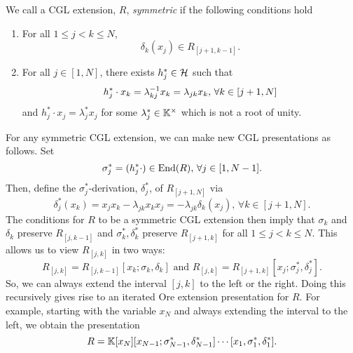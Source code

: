 \begin{definition}
	We call a CGL extension, $R$, \emph{symmetric} if the following conditions hold
	\begin{enumerate}
		\item For all $1\leq j < k \leq N$,
		      \begin{equation*}
			      \delta_k (x_j) \in R_{[j+1, k-1]}.
		      \end{equation*}
		\item For all $j \in [1, N]$, there exists $h^*_j \in \mathcal{H}$ such that
		      \begin{equation*}
			      h^*_j \cdot x_k = \lambda_{kj}^{-1} x_k = \lambda_{jk}x_k, \, \forall k \in [j+1, N]
		      \end{equation*}
		      and $h^*_j \cdot x_j = \lambda^*_j x_j$ for some $\lambda_j^*\in \mathbb{K}^\times$ which is not a root of unity.
	\end{enumerate}
\end{definition}
For any symmetric CGL extension, we can make new CGL presentations as follows. Set
\begin{equation*}
	\sigma_j^* = (h_j^* \cdot) \in \operatorname{End}(R),\, \forall j \in [1, N-1].
\end{equation*}
Then, define the $\sigma_j^*$-derivation, $\delta_j^*$, of $R_[j+1, N]$ via
\begin{equation*}
	\delta_j^*(x_k) = x_j x_k - \lambda_{jk}x_kx_j = -\lambda_{jk} \delta_k (x_j), \, \forall k \in [j+1, N].
\end{equation*}
%
The conditions for $R$ to be a symmetric CGL extension then imply that $\sigma_k$ and
$\delta_k$ preserve $R_{[j, k-1]}$ and $\sigma_k^*, \delta_k^*$ preserve $R_{[j+1, k]}$
for all $1 \leq j < k \leq N$. This allows us to view $R_{[j, k]}$ in two ways:
\begin{equation*}
	R_{[j, k]} = R_{[j, k-1]}[x_k; \sigma_k, \delta_k] \text{ and } R_{[j,k]} = R_{[j+1, k]}[x_j; \sigma_j^*, \delta_j^*].
\end{equation*}
So, we can always extend the interval $[j, k]$ to the left or the right. Doing this recursively gives rise to an iterated Ore extension presentation for $R$. For example, starting with the variable $x_N$ and always extending the interval to the left, we obtain the presentation
\begin{equation*}
	R = \mathbb{K}[x_N][x_{N-1}; \sigma_{N-1}^*, \delta_{N-1}^*]\cdots [x_1, \sigma_1^*, \delta_1^*].
\end{equation*}
